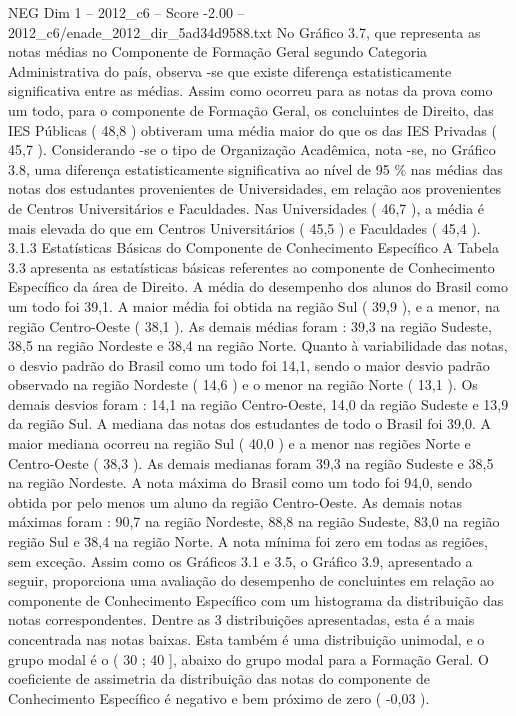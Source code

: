 \begin{textsample}{NEG Dim 1 – 2012\_c6 – Score -2.00 – 2012\_c6/enade\_2012\_dir\_5ad34d9588.txt}
No Gráfico 3.7, que representa as notas médias no Componente de Formação Geral segundo Categoria Administrativa do país, observa -se que existe diferença estatisticamente significativa entre as médias.
Assim como ocorreu para as notas da prova como um todo, para o componente de Formação Geral, os concluintes de Direito, das IES Públicas ( 48,8 ) obtiveram uma média maior do que os das IES Privadas ( 45,7 ).
Considerando -se o tipo de Organização Acadêmica, nota -se, no Gráfico 3.8, uma diferença estatisticamente significativa ao nível de 95 \% nas médias das notas dos estudantes provenientes de Universidades, em relação aos provenientes de Centros Universitários e Faculdades.
Nas Universidades ( 46,7 ), a média é mais elevada do que em Centros Universitários ( 45,5 ) e Faculdades ( 45,4 ). 3.1.3 Estatísticas Básicas do Componente de Conhecimento Específico A Tabela 3.3 apresenta as estatísticas básicas referentes ao componente de Conhecimento Específico da área de Direito.
A média do desempenho dos alunos do Brasil como um todo foi 39,1.
A maior média foi obtida na região Sul ( 39,9 ), e a menor, na região Centro-Oeste ( 38,1 ).
As demais médias foram : 39,3 na região Sudeste, 38,5 na região Nordeste e 38,4 na região Norte.
Quanto à variabilidade das notas, o desvio padrão do Brasil como um todo foi 14,1, sendo o maior desvio padrão observado na região Nordeste ( 14,6 ) e o menor na região Norte ( 13,1 ).
Os demais desvios foram : 14,1 na região Centro-Oeste, 14,0 da região Sudeste e 13,9 da região Sul.
A mediana das notas dos estudantes de todo o Brasil foi 39,0.
A maior mediana ocorreu na região Sul ( 40,0 ) e a menor nas regiões Norte e Centro-Oeste ( 38,3 ).
As demais medianas foram 39,3 na região Sudeste e 38,5 na região Nordeste.
A nota máxima do Brasil como um todo foi 94,0, sendo obtida por pelo menos um aluno da região Centro-Oeste.
As demais notas máximas foram : 90,7 na região Nordeste, 88,8 na região Sudeste, 83,0 na região região Sul e 38,4 na região Norte.
A nota mínima foi zero em todas as regiões, sem exceção.
Assim como os Gráficos 3.1 e 3.5, o Gráfico 3.9, apresentado a seguir, proporciona uma avaliação do desempenho de concluintes em relação ao componente de Conhecimento Específico com um histograma da distribuição das notas correspondentes.
Dentre as 3 distribuições apresentadas, esta é a mais concentrada nas notas baixas.
Esta também é uma distribuição unimodal, e o grupo modal é o ( 30 ; 40 ], abaixo do grupo modal para a Formação Geral.
O coeficiente de assimetria da distribuição das notas do componente de Conhecimento Específico é negativo e bem próximo de zero ( -0,03 ).

\end{textsample}
